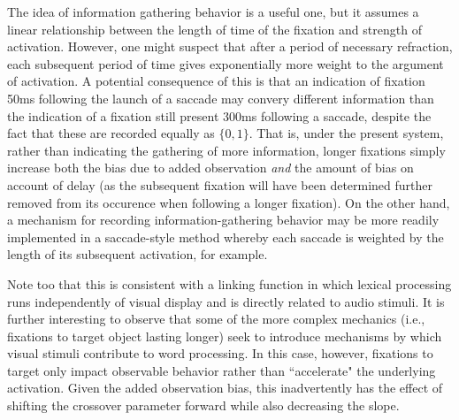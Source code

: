 \documentclass{article}
\begin{document}
The idea of information gathering behavior is a useful one, but it assumes a linear relationship between the length of time of the fixation and strength of activation. However, one might suspect that after a period of necessary refraction, each subsequent period of time gives exponentially more weight to the argument of activation. A potential consequence of this is that an indication of fixation 50ms following the launch of a saccade may convery different information than the indication of a fixation still present 300ms following a saccade, despite the fact that these are recorded equally as $\{0,1\}$. That is, under the present system, rather than indicating the gathering of more information, longer fixations simply increase both the bias due to added observation \textit{and} the amount of bias on account of delay (as the subsequent fixation will have been determined further removed from its occurence when following a longer fixation). On the other hand, a mechanism for recording information-gathering behavior may be more readily implemented in a saccade-style method whereby each saccade is weighted by the length of its subsequent activation, for example.

Note too that this is consistent with a linking function in which lexical processing runs independently of visual display and is directly related to audio stimuli. It is further interesting to observe that some of the more complex mechanics (i.e., fixations to target object lasting longer) seek to introduce mechanisms by which visual stimuli contribute to word processing. In this case, however, fixations to target only impact observable behavior rather than ``accelerate" the underlying activation. Given the added observation bias, this inadvertently has the effect of shifting the crossover parameter forward while also decreasing the slope.
\end{document}
